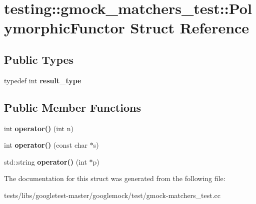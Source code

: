 \hypertarget{structtesting_1_1gmock__matchers__test_1_1PolymorphicFunctor}{}\section{testing\+:\+:gmock\+\_\+matchers\+\_\+test\+:\+:Polymorphic\+Functor Struct Reference}
\label{structtesting_1_1gmock__matchers__test_1_1PolymorphicFunctor}
\subsection*{Public Types}
\begin{DoxyCompactItemize}
\item 
\mbox{\label{structtesting_1_1gmock__matchers__test_1_1PolymorphicFunctor_ae2b921ecae158b5eaa11a29ac6fe0cf3}} 
typedef int {\bfseries result\+\_\+type}
\end{DoxyCompactItemize}
\subsection*{Public Member Functions}
\begin{DoxyCompactItemize}
\item 
\mbox{\label{structtesting_1_1gmock__matchers__test_1_1PolymorphicFunctor_a2fb8b012acd2ccd52788231036877c98}} 
int {\bfseries operator()} (int n)
\item 
\mbox{\label{structtesting_1_1gmock__matchers__test_1_1PolymorphicFunctor_aee4d200c7f85ce4d8048d1798a511002}} 
int {\bfseries operator()} (const char $\ast$s)
\item 
\mbox{\label{structtesting_1_1gmock__matchers__test_1_1PolymorphicFunctor_afadd033a9ae644f159fff6c14a247a70}} 
std\+::string {\bfseries operator()} (int $\ast$p)
\end{DoxyCompactItemize}


The documentation for this struct was generated from the following file\+:\begin{DoxyCompactItemize}
\item 
tests/libs/googletest-\/master/googlemock/test/gmock-\/matchers\+\_\+test.\+cc\end{DoxyCompactItemize}

